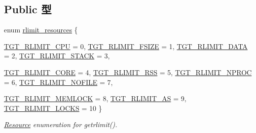 \subsection*{Public 型}
\begin{DoxyCompactItemize}
\item 
enum \hyperlink{classArmLinux64_a599454267926920de3bd5a488bda3e03}{rlimit\_\-resources} \{ \par
\hyperlink{classArmLinux64_a599454267926920de3bd5a488bda3e03ad2d72256a0d172755a5984018f2afad8}{TGT\_\-RLIMIT\_\-CPU} =  0, 
\hyperlink{classArmLinux64_a599454267926920de3bd5a488bda3e03ae0f07966ad956cd9e702fb01a4f3a9a1}{TGT\_\-RLIMIT\_\-FSIZE} =  1, 
\hyperlink{classArmLinux64_a599454267926920de3bd5a488bda3e03abcf6a52c98bdfad0832696b231de99a2}{TGT\_\-RLIMIT\_\-DATA} =  2, 
\hyperlink{classArmLinux64_a599454267926920de3bd5a488bda3e03a08e62a1dfe173892d7a251c73a8a3f6a}{TGT\_\-RLIMIT\_\-STACK} =  3, 
\par
\hyperlink{classArmLinux64_a599454267926920de3bd5a488bda3e03a89e77f710c8de2c5d30f835b6f9ecff4}{TGT\_\-RLIMIT\_\-CORE} =  4, 
\hyperlink{classArmLinux64_a599454267926920de3bd5a488bda3e03af8c89e70a7d4ff9e8854599d3a168529}{TGT\_\-RLIMIT\_\-RSS} =  5, 
\hyperlink{classArmLinux64_a599454267926920de3bd5a488bda3e03af653a805832a388dbc3548d5d06150cb}{TGT\_\-RLIMIT\_\-NPROC} =  6, 
\hyperlink{classArmLinux64_a599454267926920de3bd5a488bda3e03af2a76cff253996593d8c22981696e110}{TGT\_\-RLIMIT\_\-NOFILE} =  7, 
\par
\hyperlink{classArmLinux64_a599454267926920de3bd5a488bda3e03a1c5dcb48959f77f93f7c104f76b4b88d}{TGT\_\-RLIMIT\_\-MEMLOCK} =  8, 
\hyperlink{classArmLinux64_a599454267926920de3bd5a488bda3e03a3f118b58936b90cf8382d441ef567c39}{TGT\_\-RLIMIT\_\-AS} =  9, 
\hyperlink{classArmLinux64_a599454267926920de3bd5a488bda3e03aabd123e8e2b5b10d6a26e053b938a3e6}{TGT\_\-RLIMIT\_\-LOCKS} =  10
 \}
\begin{DoxyCompactList}\small\item\em \hyperlink{classResource}{Resource} enumeration for getrlimit(). \item\end{DoxyCompactList}\end{DoxyCompactItemize}
